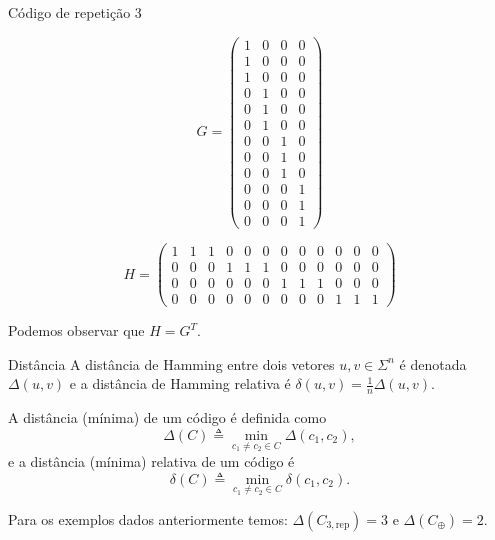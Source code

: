 \begin{frame}[allowframebreaks]
\begin{block}{Código de repetição 3}
    \noindent\begin{minipage}{.5\linewidth}
      \scriptsize
      \begin{equation}
        G =
        \begin{pmatrix}
          1 & 0 & 0 & 0 \\
          1 & 0 & 0 & 0 \\
          1 & 0 & 0 & 0 \\
          0 & 1 & 0 & 0 \\
          0 & 1 & 0 & 0 \\
          0 & 1 & 0 & 0 \\
          0 & 0 & 1 & 0 \\
          0 & 0 & 1 & 0 \\
          0 & 0 & 1 & 0 \\
          0 & 0 & 0 & 1 \\
          0 & 0 & 0 & 1 \\
          0 & 0 & 0 & 1 
        \end{pmatrix}
      \end{equation}
    \end{minipage}%
    \begin{minipage}{.5\linewidth}
      \scriptsize
      \begin{equation}
        H =
        \begin{pmatrix}
          1 & 1 & 1 & 0 & 0 & 0 & 0 & 0 & 0 & 0 & 0 & 0 \\
          0 & 0 & 0 & 1 & 1 & 1 & 0 & 0 & 0 & 0 & 0 & 0 \\
          0 & 0 & 0 & 0 & 0 & 0 & 1 & 1 & 1 & 0 & 0 & 0 \\
          0 & 0 & 0 & 0 & 0 & 0 & 0 & 0 & 0 & 1 & 1 & 1 
        \end{pmatrix}
      \end{equation}

      Podemos observar que $H = G^{T}$.
    \end{minipage}
  \end{block}


  \begin{block}{Distância}
    A distância de Hamming entre dois vetores $u, v \in \Sigma^n$ é denotada $\Delta(u,v)$ e a distância de Hamming relativa é $\delta(u,v) = \frac{1}{n} \Delta(u,v)$.

    \vspace{3ex}
    A distância (mínima) de um código é definida como
    \begin{equation}
      \Delta(C) \triangleq \min_{c_1 \neq c_2 \in C} \Delta(c_1,c_2),
    \end{equation}
    e a distância (mínima) relativa de um código é
    \begin{equation}
      \delta(C) \triangleq \min_{c_1 \neq c_2 \in C} \delta(c_1,c_2).
    \end{equation}
  \end{block}
  Para os exemplos dados anteriormente temos:
  $\Delta(C_{3,\text{rep}}) = 3$ e $\Delta(C_{\oplus}) = 2$.


\end{frame}
